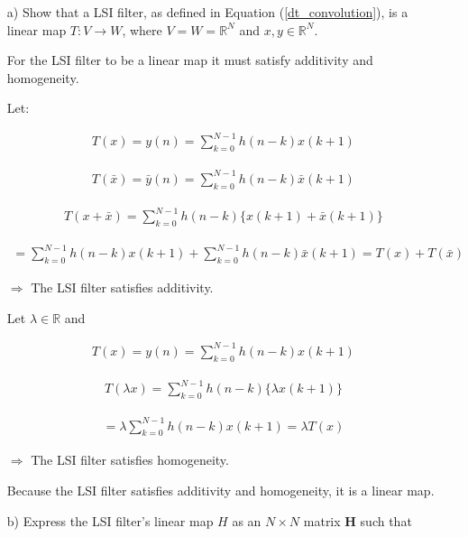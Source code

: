 \documentclass[fleqn]{article}
\begin{document}
\begin{enumerate}[nolistsep]
		\pagebreak
		\begin{enumerate}
			\item[a)] Show that a LSI filter, as defined in Equation (\ref{dt_convolution}), is a linear map $T : V \rightarrow W$, where $V = W = \mathbb{R}^N$ and $x,y \in \mathbb{R}^N$.
			
			For the LSI filter to be a linear map it must satisfy additivity and homogeneity.
			
			Let:
			
			\begin{align*}
				T(x) = y(n) = \sum_{k=0}^{N-1}{h(n-k)x(k+1)}
			\end{align*}
			
			\begin{align*}
				T(\bar{x}) = \bar{y}(n) = \sum_{k=0}^{N-1}{h(n-k)\bar{x}(k+1)}
			\end{align*}
			
			\begin{align*}
				T(x + \bar{x}) = \sum_{k=0}^{N-1}{h(n-k)\{x(k+1) + \bar{x}(k+1)\}}
			\end{align*}
			
			\begin{align*}
				 = \sum_{k=0}^{N-1}{h(n-k)x(k+1)} + \sum_{k=0}^{N-1}{h(n-k)\bar{x}(k+1)} = T(x) + T(\bar{x})
			\end{align*}
			
			$\Rightarrow$ The LSI filter satisfies additivity.
			
			Let $\lambda \in \mathbb{R}$ and
			
			\begin{align*}
				T(x) = y(n) = \sum_{k=0}^{N-1}{h(n-k)x(k+1)}
			\end{align*}
			
			\begin{align*}
				T(\lambda x) = \sum_{k=0}^{N-1}{h(n-k)\{\lambda x(k+1)\}}
			\end{align*}
			
			\begin{align*}
			= \lambda\sum_{k=0}^{N-1}{h(n-k) x(k+1)} = \lambda T(x)
			\end{align*}
			
			$\Rightarrow$ The LSI filter satisfies homogeneity.
			
			Because the LSI filter satisfies additivity and homogeneity, it is a linear map.
			
			\pagebreak
			\item[b)] Express the LSI filter's linear map $H$ as an $N \times N$ matrix $\mathbf{H}$ such that
			

\end{enumerate}
\end{enumerate}
\end{document}
